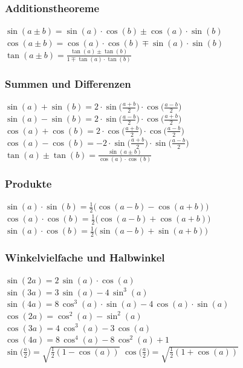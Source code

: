 		
		\vfill\null
		\columnbreak

		\subsubsection{Additionstheoreme}
		
		$\sin(a \pm b) = \sin(a) \cdot \cos(b) \pm \cos(a) \cdot \sin(b)$ \\
		$\cos(a \pm b) = \cos(a) \cdot \cos(b) \mp \sin(a) \cdot \sin(b) $ \\
		$\tan(a \pm b) = \frac{\tan(a) \pm \tan(b)}{1 \mp \tan(a) \cdot \tan(b)}$
		
	
		\subsubsection{Summen und Differenzen}
		
		$\sin(a) + \sin(b) = 2 \cdot \sin \big( \frac{a+b}{2} \big) \cdot \cos \big( \frac{a-b}{2} \big)$ \\
		$\sin(a) - \sin(b) = 2 \cdot \sin \big( \frac{a-b}{2} \big) \cdot \cos \big( \frac{a+b}{2} \big)$ \\
		$\cos(a) + \cos(b) = 2 \cdot \cos \big( \frac{a+b}{2} \big) \cdot \cos \big( \frac{a-b}{2} \big)$ \\
		$\cos(a) - \cos(b) = -2 \cdot \sin \big( \frac{a+b}{2} \big) \cdot \sin \big( \frac{a-b}{2} \big)$ \\
		$\tan(a) \pm \tan(b) = \frac{\sin(a \pm b)}{\cos(a) \cdot \cos(b)}$ 
		
			
		
		\subsubsection{Produkte}
		$\sin(a) \cdot \sin(b) = \frac{1}{2} \big( \cos(a-b) - \cos(a+b) \big) $ \\
		$\cos(a) \cdot \cos(b) = \frac{1}{2} \big( \cos(a-b) + \cos(a+b) \big) $ \\	
		$\sin(a) \cdot \cos(b) = \frac{1}{2} \big( \sin(a-b) + \sin(a+b) \big) $ 
			
			
		\subsubsection{Winkelvielfache und Halbwinkel}
		$\sin(2a) = 2 \, \sin(a) \cdot \cos(a)$ \\
		$\sin(3a) = 3 \, \sin(a) -4 \, \sin^3(a)$ \\ 
		$\sin(4a) = 8 \, \cos^3(a) \cdot \sin(a) - 4 \, \cos(a) \cdot \sin(a)$ \\
		\vspace{0.2cm}
		$\cos(2a) = \cos^2(a) - \sin^2(a)$ \\
		$\cos(3a) = 4 \, \cos^3(a) -3 \, \cos(a)$ \\ 
		$\cos(4a) = 8 \, \cos^4(a) - 8 \, \cos^2(a) + 1$ \\
		\vspace{0.2cm}
		$\sin \big( \frac{a}{2} \big) = \sqrt{\frac{1}{2}(1-\cos(a))} $ \qquad $\cos \big( \frac{a}{2} \big) = \sqrt{\frac{1}{2}(1+\cos(a))} $ 
		
